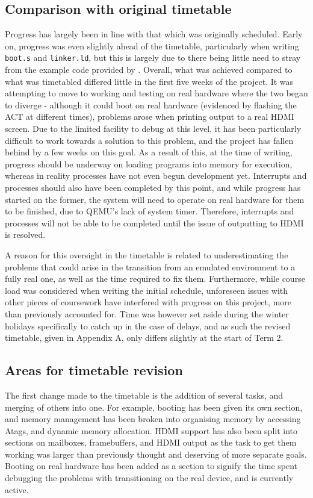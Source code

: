 \documentclass[10pt,a4paper]{article}
\newcommand{\code}[1]{\texttt{#1}}
\begin{document}
\subsection*{Comparison with original timetable}
Progress has largely been in line with that which was originally scheduled.
Early on, progress was even slightly ahead of the timetable, particularly when
writing \code{boot.s} and \code{linker.ld}, but this is largely due to there
being little need to stray from the example code provided by \cite{OSDevBoot}.
Overall, what was achieved compared to what was timetabled differed little in
the first five weeks of the project. It was attempting to move to working and
testing on real hardware where the two began to diverge - although it could boot
on real hardware (evidenced by flashing the ACT at different times), problems
arose when printing output to a real HDMI screen. Due to the limited facility to
debug at this level, it has been particularly difficult to work towards a
solution to this problem, and the project has fallen behind by a few weeks on
this goal. As a result of this, at the time of writing, progress should be
underway on loading programs into memory for execution, whereas in reality
processes have not even begun development yet. Interrupts and processes should
also have been completed by this point, and while progress has started on the
former, the system will need to operate on real hardware for them to be finished,
due to QEMU's lack of system timer. Therefore, interrupts and processes will not
be able to be completed until the issue of outputting to HDMI is resolved.

A reason for this oversight in the timetable is related to underestimating the
problems that could arise in the transition from an emulated environment to a
fully real one, as well as the time required to fix them. Furthermore, while
course load was considered when writing the initial schedule, unforeseen issues
with other pieces of coursework have interfered with progress on this project,
more than previously accounted for. Time was however set aside during the winter
holidays specifically to catch up in the case of delays, and as such the revised
timetable, given in Appendix A, only differs slightly at the start of Term 2.

\subsection*{Areas for timetable revision}
The first change made to the timetable is the addition of several tasks, and
merging of others into one. For example, booting has been given its own section,
and memory management has been broken into organising memory by accessing Atags,
and dynamic memory allocation. HDMI support has also been split into sections on
mailboxes, framebuffers, and HDMI output as the task to get them working was
larger than previously thought and deserving of more separate goals. Booting on
real hardware has been added as a section to signify the time spent debugging
the problems with transitioning on the real device, and is currently active.
\end{document}
